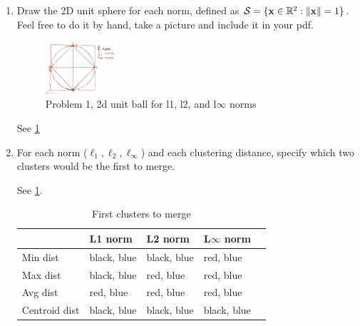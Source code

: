 \documentclass[submit]{harvardml}
\newenvironment{answer}{%
\color{answergreen}\sffamily\large}{}
\begin{document}
\begin{enumerate}
    \item Draw the 2D unit sphere for each norm,
        defined as $\mathcal{S} = \{\mathbf{x} \in \mathbb{R}^2: \|\mathbf{x}\| = 1 \}$. Feel free to do
        it by hand, take a picture and include it in your pdf.

        \begin{answer}
            \begin{figure}
                \centering
                \includegraphics[width=0.25\textwidth]{p1_norms.jpg}
                \caption{Problem 1, 2d unit ball for l1, l2, and l$\infty$ norms}
                \label{p1}
            \end{figure}
        \label{P3 Means}

        See \cref{p1}
        \end{answer}

    \item  For each norm ($\ell_1, \ell_2, \ell_\infty$) and each clustering distance, specify which
        two clusters would be the first to merge.

        \begin{answer}
            See \cref{firstmerge}.

            \begin{table}[h]
                \centering
                \caption{First clusters to merge}
                \label{firstmerge}
                \begin{tabular}{@{}lllll@{}}
                    \toprule
                    & L1 norm     & L2 norm     & L$\infty$ norm     &  \\ \midrule
                    \multicolumn{1}{l|}{Min dist}      & black, blue & black, blue & red, blue   &
                    \\
                    \multicolumn{1}{l|}{Max dist}      & black, blue & red, blue & red, blue   &
                    \\
                    \multicolumn{1}{l|}{Avg dist}      & red, blue   & red, blue   & red, blue   &
                    \\
                    \multicolumn{1}{l|}{Centroid dist} & black, blue & black, blue & black, blue &
                    \\ \bottomrule
                \end{tabular}
            \end{table}
        \end{answer}


\end{enumerate}
\end{document}
